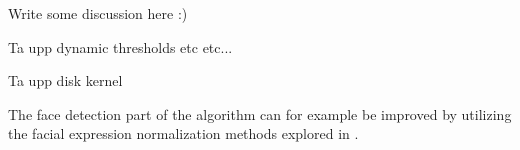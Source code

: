 Write some discussion here :)

Ta upp dynamic thresholds etc etc...

Ta upp disk kernel

The face detection part of the algorithm can for example be improved by utilizing the facial expression normalization methods explored in  \cite{facialExpressions}.